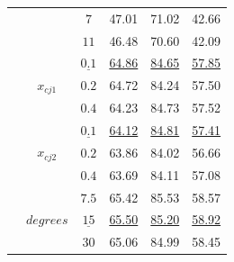 \documentclass[letterpaper]{article} %
\begin{document}
\begin{table}[t]
\begin{center}
{\begin{tabular}{c!{\vrule}cc!{\vrule}ccc}
& & $7$ & 47.01 & 71.02 & 42.66 \\
& & $11$ & 46.48 & 70.60 & 42.09 \\
\midrule

 &  & ${\underline{0.1}}$ &  \underline{64.86} & \underline{84.65} & \underline{57.85} \\
& & $0.2$ & 64.72 & 84.24 & 57.50 \\
& & $0.4$ & 64.23 & 84.73 & 57.52 \\
 &  & $\underline{0.1}$ & \underline{64.12} & \underline{84.81} & \underline{57.41}\\
&&$0.2$ & 63.86 & 84.02 & 56.66\\
&&$0.4$ & 63.69 & 84.11 & 57.08\\
\midrule
{} &  & $7.5$ & 65.42 & 85.53 & 58.57 \\
& & ${\underline{15}}$ &  \underline{65.50} &  \underline{85.20} &  \underline{58.92} \\
& & $30$ & 65.06 & 84.99 & 58.45 \\
\bottomrule
\end{tabular}}
\end{center}
\vspace{-0.5cm}
\end{table}
\end{document}
